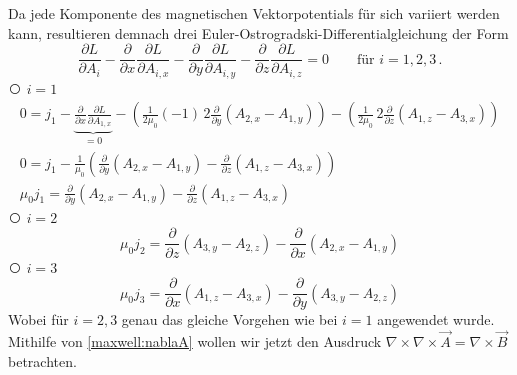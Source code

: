 Da jede Komponente des magnetischen Vektorpotentials für sich variiert werden kann, resultieren demnach drei Euler-Ostrogradski-Differentialgleichung der Form
\[ 
\frac{\partial L}{\partial A_i} 
- \frac{\partial}{\partial x}\frac{\partial L}{\partial A_{i,x}}
- \frac{\partial}{\partial y}\frac{\partial L}{\partial A_{i,y}}
- \frac{\partial}{\partial z}\frac{\partial L}{\partial A_{i,z}}
= 0 \qquad \text{für } i=1,2,3
\, . \]
{\larger\textcircled{}} $i = 1$
\begin{subequations}
	\label{maxwell:magnetoL1}
\begin{gather}
	0
	=
	j_1 - \underbrace{\frac{\partial}{\partial x}\frac{\partial L}{\partial A_{1,x}}}_{=0}
	 - \left( \frac{1}{2\mu_0}(-1)\,2 \frac{\partial}{\partial y}(A_{2,x}-A_{1,y})\right) 
	 - \left( \frac{1}{2\mu_0}\,2\frac{\partial}{\partial z}(A_{1,z}-A_{3,x})\right)
	 \\
	 0
	 =
	 j_1 - \frac{1}{\mu_0}\left( \frac{\partial}{\partial y}(A_{2,x}-A_{1,y})
	 - \frac{\partial}{\partial z}(A_{1,z}-A_{3,x})
	 \right)  
	 \\	 
	 \mu_0j_1
	 =
	 \frac{\partial}{\partial y}(A_{2,x}-A_{1,y})
	 - \frac{\partial}{\partial z}(A_{1,z}-A_{3,x})	 	 	 
\end{gather}
\end{subequations}
{\larger\textcircled{}} $i = 2$
\begin{equation}
	\label{maxwell:magnetoL2}
	\mu_0j_2
	=
	\frac{\partial}{\partial z}(A_{3,y}-A_{2,z})
	- \frac{\partial}{\partial x}(A_{2,x}-A_{1,y})
\end{equation}
{\larger\textcircled{}} $i = 3$
\begin{equation}
	\label{maxwell:magnetoL3}
	\mu_0j_3
	=
	\frac{\partial}{\partial x}(A_{1,z}-A_{3,x})
	- \frac{\partial}{\partial y}(A_{3,y}-A_{2,z})
\end{equation}
Wobei für $i=2,3$ genau das gleiche Vorgehen wie bei $i=1$ angewendet wurde.
Mithilfe von \eqref{maxwell:nablaA} wollen wir jetzt den Ausdruck $\nabla\times\nabla\times\vec{A} = \nabla\times\vec{B}$ betrachten.

